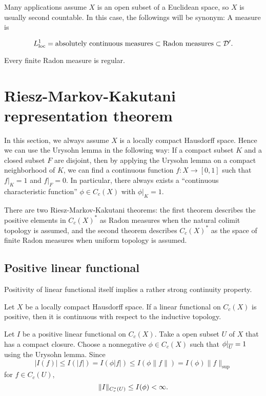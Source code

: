 \documentclass{../crs}
\begin{document}
Many applications assume $X$ is an open subset of a Euclidean space, so $X$ is usually second countable.
In this case, the followings will be synonym: A measure is
\begin{cond}
\item 
\end{cond}



\[L_{\text{loc}}^1=\text{absolutely continuous measures}\subset\text{Radon measures}\subset\mathcal{D}'.\]


\begin{thm}
Every finite Radon measure is regular.
\end{thm}

\section{Riesz-Markov-Kakutani representation theorem}
In this section, we always assume $X$ is a locally compact Hausdorff space.
Hence we can use the Urysohn lemma in the following way: If a compact subset $K$ and a closed subset $F$ are disjoint, then by applying the Urysohn lemma on a compact neighborhood of $K$, we can find a continuous function $f:X\to[0,1]$ such that $f|_K=1$ and $f|_F=0$.
In particular, there always exists a ``continuous characteristic function'' $\phi\in C_c(X)$ with $\phi|_K=1$.

There are two Riesz-Markov-Kakutani theorems: the first theorem describes the positive elements in $C_c(X)^*$ as Radon measures when the natural colimit topology is assumed, and the second theorem describes $C_c(X)^*$ as the space of finite Radon measures when uniform topology is assumed.

\subsection{Positive linear functional}
Positivity of linear functional itself implies a rather strong continuity property.
\begin{thm}
Let $X$ be a locally compact Hausdorff space.
If a linear functional on $C_c(X)$ is positive, then it is continuous with respect to the inductive topology.
\end{thm}
\begin{pf}
Let $I$ be a positive linear functional on $C_c(X)$.
Take a open subset $U$ of $X$ that has a compact closure.
Choose a nonnegative $\phi\in C_c(X)$ such that $\phi|_{\overline{U}}=1$ using the Urysohn lemma.
Since
\[|I(f)|\le I(|f|)=I(\phi|f|)\le I(\phi\|f\|)=I(\phi)\|f\|_{\sup}\]
for $f\in C_c(U)$,
\[\|I\|_{C_c^*(U)}\le I(\phi)<\infty.\]
\end{pf}
\end{document}
